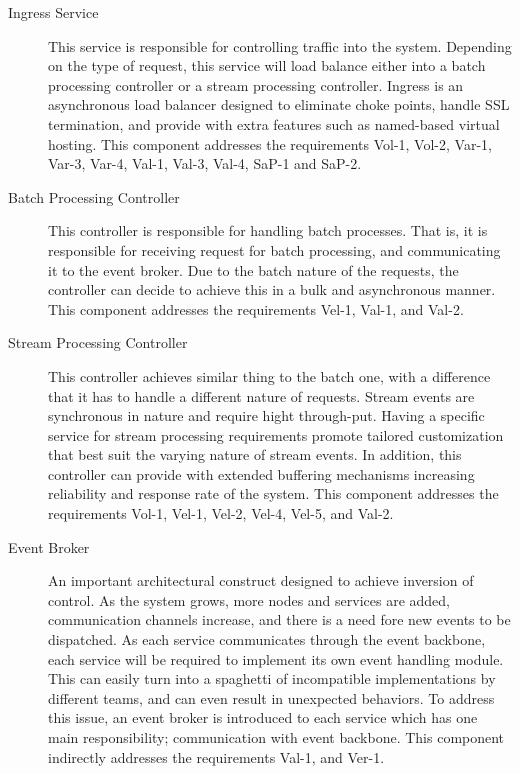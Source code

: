 \documentclass[a4paper,11pt]{article}
\begin{document}
\begin{description}
    \item[Ingress Service] This service is responsible for controlling traffic into the system. Depending on the type of request, this service will load balance either into a batch processing controller or a stream processing controller. Ingress is an asynchronous load balancer designed to eliminate choke points, handle SSL termination, and provide with extra features such as named-based virtual hosting. This component addresses the requirements Vol-1, Vol-2, Var-1, Var-3, Var-4, Val-1, Val-3, Val-4, SaP-1 and SaP-2. 
    
    \item[Batch Processing Controller] This controller is responsible for handling batch processes. That is, it is responsible for receiving request for batch processing, and communicating it to the event broker. Due to the batch nature of the requests, the controller can decide to achieve this in a bulk and asynchronous manner. This component addresses the requirements Vel-1, Val-1, and Val-2. 
    
    \item[Stream Processing Controller] This controller achieves similar thing to the batch one, with a difference that it has to handle a different nature of requests. Stream events are synchronous in nature and require hight through-put. Having a specific service for stream processing requirements promote tailored customization that best suit the varying nature of stream events. In addition, this controller can provide with extended buffering mechanisms increasing reliability and response rate of the system. This component addresses the requirements Vol-1, Vel-1, Vel-2, Vel-4, Vel-5, and Val-2.  
    
    \item[Event Broker] An important architectural construct designed to achieve inversion of control. As the system grows, more nodes and services are added, communication channels increase, and there is a need fore new events to be dispatched. As each service communicates through the event backbone, each service will be required to implement its own event handling module. This can easily turn into a spaghetti of incompatible implementations by different teams, and can even result in unexpected behaviors. To address this issue, an event broker is introduced to each service which has one main responsibility; communication with event backbone. This component indirectly addresses the requirements Val-1, and Ver-1.  
    

\end{description}
\end{document}
